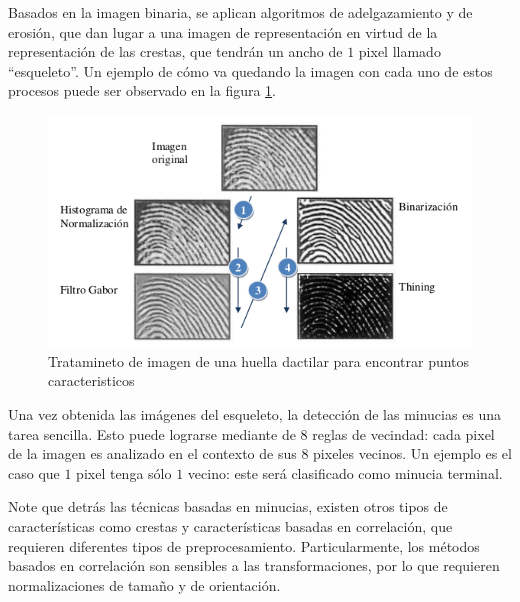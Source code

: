 Basados en la imagen binaria, se aplican algoritmos de adelgazamiento y de erosión, que dan lugar a una imagen de representación en virtud de la representación de las crestas, que tendrán un ancho de $1$ pixel llamado ``esqueleto''. Un ejemplo de cómo va quedando la imagen con cada uno de estos procesos puede ser observado en la figura \ref{tratamiento}.


\begin{figure}[H]
\centering
\includegraphics{images/capitulo2/tratamiento.png}
\caption{Tratamineto de imagen de una huella dactilar para encontrar puntos caracteristicos}
\label{tratamiento}
\end{figure}


Una vez obtenida las imágenes del esqueleto, la detección de las minucias es una tarea sencilla. Esto puede lograrse mediante de $8$ reglas de vecindad: cada pixel de la imagen es analizado en el contexto de sus $8$ pixeles vecinos. Un ejemplo es el caso que $1$ pixel tenga sólo $1$ vecino: este será clasificado como minucia terminal.


Note que detrás las técnicas basadas en minucias, existen otros tipos de características como crestas y características basadas en correlación, que requieren diferentes tipos de preprocesamiento. Particularmente, los métodos basados en correlación son sensibles a las transformaciones, por lo que requieren normalizaciones de tamaño y de orientación.



